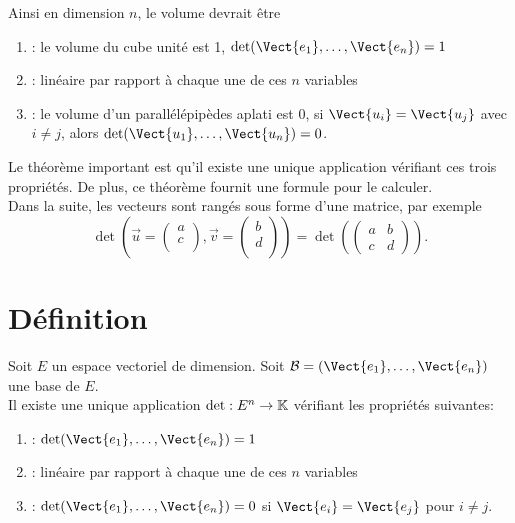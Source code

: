 \documentclass{book}
\begin{document}
\begin{Exemple}
Ainsi en dimension $n$, le volume devrait être 
\begin{enumerate}
\item {} : le volume du cube unité est 1, $\det(\Vect{e_1},\dots,\Vect{e_n})=1$
\item {} : linéaire par rapport à chaque une de ces $n$ variables
\item {} : le volume d'un parallélépipèdes aplati est 0,  si $\Vect{u_i}=\Vect{u_j}$ avec $i\neq j$,  alors $\det(\Vect{u_1},\dots,\Vect{u_n})=0$.
\end{enumerate}
Le théorème important est qu'il existe une unique application vérifiant ces trois propriétés. De plus, ce théorème fournit une formule pour le calculer.\\
Dans la suite, les vecteurs sont rangés sous forme d'une matrice, par exemple $$\det(\vec{u}=\begin{pmatrix}
a  \\
c \\
\end{pmatrix} ,\vec{v}=\begin{pmatrix}
b  \\
d \\
\end{pmatrix})=\det(\begin{pmatrix}
a & b \\
c & d
\end{pmatrix}).$$ 
  
\end{Exemple}
\section{Définition}
\begin{Theoreme}
Soit $E$ un espace vectoriel de dimension. Soit $\mathcal{B}=(\Vect{e_1},\dots,\Vect{e_n})$ une base de $E$.\\
Il existe une unique application $\mathop{\mathrm{det}}\nolimits: E^n\to\mathbb{K}$ vérifiant les propriétés suivantes:
\begin{enumerate}
\item {} : $\det(\Vect{e_1},\dots,\Vect{e_n}) = 1$
\item {} : linéaire par rapport à chaque une de ces $n$ variables
\item
   : $\det(\Vect{e_1},\dots,\Vect{e_n}) = 0$ si $\Vect{e_i}=\Vect{e_j}$ pour $i\neq j$.
\end{enumerate}
\end{Theoreme}
\end{document}
